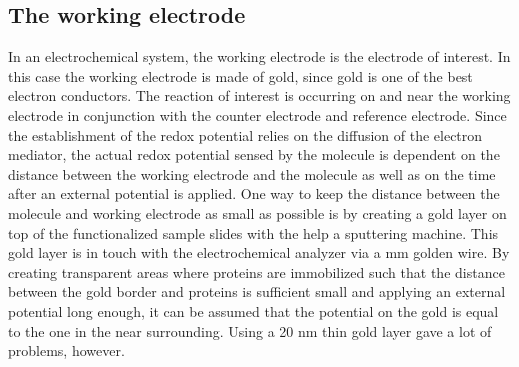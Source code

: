\documentclass[twoside,single]{lion-msc}
\begin{document}
\subsection{The working electrode}
In an electrochemical system, the working electrode is the electrode of interest. In this case the working electrode is made of gold, since gold is one of the best electron conductors. The reaction of interest is occurring on and near the working electrode in conjunction with the counter electrode and reference electrode. Since the establishment of the redox potential relies on the diffusion of the electron mediator, the actual redox potential sensed by the molecule is dependent on the distance between the working electrode and the molecule as well as on the time after an external potential is applied. One way to keep the distance between the molecule and working electrode as small as possible is by creating a gold layer on top of the functionalized sample slides with the help a sputtering machine. This gold layer is in touch with the electrochemical analyzer via a  mm golden wire.  By creating transparent areas where proteins are immobilized such that the distance between the gold border and proteins is sufficient small and applying an external potential long enough, it can be assumed that the potential on the gold is equal to the one in the near surrounding. Using a 20 nm thin gold layer gave a lot of problems, however. 
\end{document}
